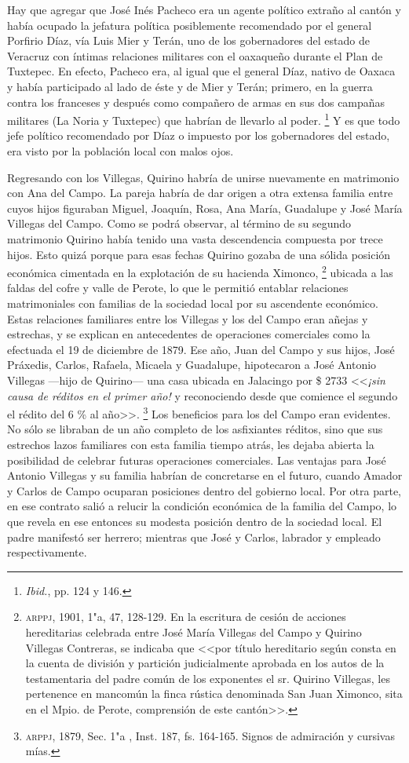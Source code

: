 \documentclass[14pt,twoside,final]{extbook} %
\let\oldfootnote\footnote
\renewcommand\footnote[1]{%
\oldfootnote{\hspace{1mm}#1}}
\begin{document}
Hay que agregar que José Inés Pacheco era un agente político extraño al cantón y había ocupado la jefatura política posiblemente recomendado por el general Porfirio Díaz, vía Luis Mier y Terán, uno de los gobernadores del estado de Veracruz con íntimas relaciones militares con el oaxaqueño durante el Plan de Tuxtepec. En efecto, Pacheco era, al igual que el general Díaz, nativo de Oaxaca y había participado al lado de éste y de Mier y Terán; primero, en la guerra contra los franceses y después como compañero de armas en sus dos campañas militares (La Noria y Tuxtepec) que habrían de llevarlo al poder.\footnote{\emph{Ibid.}, pp. 124 y 146.} Y es que todo jefe político recomendado por Díaz o impuesto por los gobernadores del estado, era visto por la población local con malos ojos.

Regresando con los Villegas, Quirino habría de unirse nuevamente en matrimonio con Ana del Campo. La pareja habría de dar origen a otra extensa familia entre cuyos hijos figuraban Miguel, Joaquín, Rosa, Ana María, Guadalupe y José María Villegas del Campo. Como se podrá observar, al término de su segundo matrimonio Quirino había tenido una vasta descendencia compuesta por trece hijos. Esto quizá porque para esas fechas Quirino gozaba de una sólida posición económica cimentada en la explotación de su hacienda Ximonco,\footnote{\textsc{arppj}, 1901, 1"a, 47, 128-129. En la escritura de cesión de acciones hereditarias celebrada entre José María Villegas del Campo y Quirino Villegas Contreras, se indicaba que <<por título hereditario según consta en la cuenta de división y partición judicialmente aprobada en los autos de la testamentaria del padre común de los exponentes el sr. Quirino Villegas, les pertenence en mancomún la finca rústica denominada San Juan Ximonco, sita en el Mpio. de Perote, comprensión de este cantón>>.} ubicada a las faldas del cofre y valle de Perote, lo que le permitió entablar relaciones matrimoniales con familias de la sociedad local por su ascendente económico. Estas relaciones familiares entre los Villegas y los del Campo eran añejas y estrechas, y se explican en antecedentes de operaciones comerciales como la efectuada el 19 de diciembre de 1879. Ese año, Juan del Campo y sus hijos, José Práxedis, Carlos, Rafaela, Micaela y Guadalupe, hipotecaron a José Antonio Villegas ---hijo de Quirino--- una casa ubicada en Jalacingo por \$ 2733 <<\emph{¡sin causa de réditos en el primer año!} y reconociendo desde que comience el segundo el rédito del 6 \% al año>>.\footnote{\textsc{arppj}, 1879, Sec. 1"a , Inst. 187, fs. 164-165. Signos de admiración y cursivas mías.} Los beneficios para los del Campo eran evidentes. No sólo se libraban de un año completo de los asfixiantes réditos, sino que sus estrechos lazos familiares con esta familia tiempo atrás, les dejaba abierta la posibilidad de celebrar futuras operaciones comerciales. Las ventajas para José Antonio Villegas y su familia habrían de concretarse en el futuro, cuando Amador y Carlos de Campo ocuparan posiciones dentro del gobierno local. Por otra parte, en ese contrato salió a relucir la condición económica de la familia del Campo, lo que revela en ese entonces su modesta posición dentro de la sociedad local. El padre manifestó ser herrero; mientras que José y Carlos, labrador y empleado respectivamente.
\end{document}

